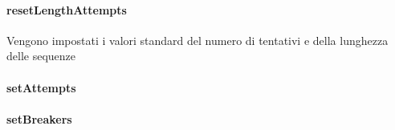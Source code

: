 \documentclass[letterpaper,10pt,italian,openany,oneside]{sphinxmanual}
\begin{document}
\begin{fulllineitems}
\label{\detokenize{source/it/unicam/cs/pa/mastermind/ui/StartStats:it.unicam.cs.pa.mastermind.ui.StartStats.isToContinue()}}
\end{fulllineitems}



\paragraph{resetLengthAttempts}
\label{\detokenize{source/it/unicam/cs/pa/mastermind/ui/StartStats:resetlengthattempts}}

\begin{fulllineitems}
\label{\detokenize{source/it/unicam/cs/pa/mastermind/ui/StartStats:it.unicam.cs.pa.mastermind.ui.StartStats.resetLengthAttempts()}}
Vengono impostati i valori standard del numero di tentativi e della lunghezza delle sequenze

\end{fulllineitems}



\paragraph{setAttempts}
\label{\detokenize{source/it/unicam/cs/pa/mastermind/ui/StartStats:setattempts}}

\begin{fulllineitems}
\label{\detokenize{source/it/unicam/cs/pa/mastermind/ui/StartStats:it.unicam.cs.pa.mastermind.ui.StartStats.setAttempts(int)}}
\end{fulllineitems}



\paragraph{setBreakers}
\label{\detokenize{source/it/unicam/cs/pa/mastermind/ui/StartStats:setbreakers}}
\end{document}
